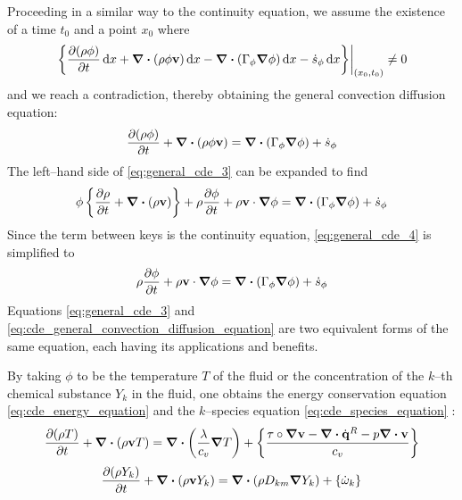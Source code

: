 Proceeding in a similar way to the continuity equation, we assume the existence
of a time $t_0$ and a point $x_0$ where
\begin{equation}
	\left.
	\left\{
	\pdv{(\rho \phi)}{t} \dd{x} + 
	\div(\rho \phi \vb{v}) \dd{x} - 
	\div(\Gamma_\phi \grad{\phi}) \dd{x} - 
	\dot{s}_\phi \dd{x}	
	\right\}
	\right\rvert_{(x_0,t_0)} \neq 0
\end{equation}
and we reach a contradiction, thereby obtaining the general convection diffusion
equation:
\begin{equation} \label{eq:general_cde_3}
	\pdv{(\rho \phi)}{t} + \div(\rho \phi \vb{v}) = 
	\div(\Gamma_\phi \grad{\phi}) + \dot{s}_\phi	
\end{equation}
The left--hand side of \eqref{eq:general_cde_3} can be expanded to find
\begin{equation} \label{eq:general_cde_4}
	\phi \left\{ \pdv{\rho}{t} + \div(\rho \vb{v}) \right\} + 
	\rho \pdv{\phi}{t} + \rho \vb{v} \cdot \grad{\phi} = 
	\div(\Gamma_\phi \grad{\phi}) + \dot{s}_\phi	
\end{equation}
Since the term between keys is the continuity equation, \eqref{eq:general_cde_4}
is simplified to
\begin{equation} \label{eq:cde_general_convection_diffusion_equation}
	\rho \pdv{\phi}{t} + \rho \vb{v} \cdot \grad{\phi} = 
	\div(\Gamma_\phi \grad{\phi}) + \dot{s}_\phi	
\end{equation}
Equations \eqref{eq:general_cde_3} and
\eqref{eq:cde_general_convection_diffusion_equation} are two equivalent forms of
the same equation, each having its applications and benefits.

By taking $\phi$ to be the temperature $T$ of the fluid or the concentration of
the $k$--th chemical substance $Y_k$ in the fluid, one obtains the energy
conservation equation \eqref{eq:cde_energy_equation} and the $k$--species
equation \eqref{eq:cde_species_equation} \cite{cttc_cde_2021}:
\begin{equation} \label{eq:cde_energy_equation}
	\pdv{(\rho T)}{t} + \div(\rho \vb{v} T) = 
	\div(\frac{\lambda}{c_v} \grad{T}) + 
	\left\{ \frac{\vb{\tau} \circ \grad{\vb{v}} - \div{\dot{\vb{q}}^R} - p \div{\vb{v}}}{c_v}\right\}
\end{equation}
\begin{equation} \label{eq:cde_species_equation}
	\pdv{(\rho Y_k)}{t} + \div(\rho \vb{v} Y_k) = 
	\div(\rho D_{km} \grad{Y_k}) + \left\{ \dot{\omega}_k \right\}
\end{equation}


